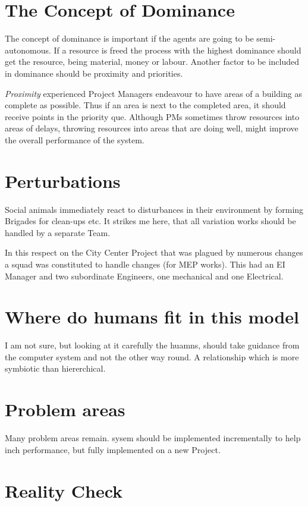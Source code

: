 \section*{The Concept of Dominance}

The concept of dominance is important if the agents are going to be semi-autonomous. If a resource is freed the process with the highest dominance should get the resource, being material, money or labour. Another factor to be included in dominance should be proximity and priorities. 

\textit{Proximity} experienced Project Managers endeavour to have areas of a building as complete as possible. Thus if an area is next to the completed area, it should receive points in the priority que. Although PMs sometimes throw resources into areas of delays, throwing resources into areas that are doing well, might improve the overall performance of the system.


\section{Perturbations}

Social animals immediately react to disturbances in their environment by forming Brigades for clean-ups etc. It strikes me here, that all variation works should be handled by a separate Team.

In this respect on the City Center Project that was plagued by numerous changes a squad was constituted to handle changes (for MEP works). This had an EI Manager and two subordinate Engineers, one mechanical and one Electrical.


\section{Where do humans fit in this model}


I am not sure, but looking at it carefully the huamns, should take guidance from the computer system and not the other way round. A relationship which is more symbiotic than hiererchical.


\section*{Problem areas}

Many problem areas remain. sysem should be implemented incrementally to help inch performance, but fully implemented on a new Project.

\section*{Reality Check}


